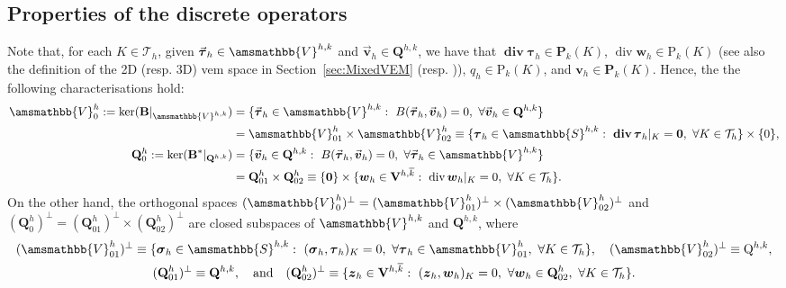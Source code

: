 \documentclass[fleqn,a4paper]{cas-sc}
\newcommand\qan{\quad\hbox{and}\quad}
\newcommand\cero{\boldsymbol{0}}
\newcommand\vdiv{\mathop{\mathrm{div}}\nolimits}
\newcommand\bdiv{\mathop{\mathbf{div}}\nolimits}
\newcommand{\bB}{\mathbf{B}}
\newcommand{\bbS}{\amsmathbb{S}}
\newcommand{\bv}{\boldsymbol{v}}
\newcommand{\bw}{\boldsymbol{w}}
\newcommand{\bz}{\boldsymbol{z}}
\newcommand{\0}{\boldsymbol{0}}
\newcommand\cT{\mathcal{T}}
\newcommand\bP{\mathbf{P}}
\newcommand\bQ{\mathbf{Q}}
\newcommand\bV{\mathbf{V}}
\newcommand\rP{\mathrm{P}}
\newcommand\rQ{\mathrm{Q}}
\newcommand\bbV{\amsmathbb{V}}
\newcommand\bsigma{\boldsymbol{\sigma}}
\newcommand\btau{\boldsymbol{\tau}}
\numberwithin{equation}{section}
\numberwithin{figure}{section}
\begin{document}
\subsection{Properties of the discrete operators}
Note that, for each $K\in \cT_h$, given $\vec{\btau}_h\in \bbV^{h,k}$ and $\vec{\bv}_h\in \bQ^{h,k}$, we have that $\bdiv\btau_h \in \bP_k(K)$, $\vdiv\bw_h \in \rP_{k}(K)$ (see also the definition of the 2D (resp. 3D) \gls{vem} space in Section~\ref{sec:MixedVEM} (resp. \cite[Theorem 8.2]{beirao16b})), $q_h\in \rP_{k}(K)$, and $\bv_h\in \bP_k(K)$. Hence, the the following characterisations hold:
    \begin{align*}
        \bbV_0^h := \mathrm{ker}(\bB |_{\bbV^{h,k}}) &= \{ \vec{\btau}_h \in \bbV^{h,k}: \ B(\vec{\btau}_h,\vec{\bv}_h) = 0 ,\ \forall \vec{\bv}_h\in \bQ^{h,k}\} \nonumber
        \\ &= \bbV_{01}^h \times \bbV_{02}^h \equiv \{ \btau_h \in \bbS^{h,k}: \ \bdiv\btau_h|_K = \cero, \ \forall K\in\cT_h\} \times \{0\}, %
        \\
        \bQ_0^h := \mathrm{ker}(\bB^*|_{\bQ^{h,k}}) &= \{ \vec{\bv}_h \in \bQ^{h,k}: \ B(\vec{\btau}_h,\vec{\bv}_h) = 0 ,\ \forall \vec{\btau}_h\in \bbV^{h,k}\}  \nonumber 
        \\ &= \bQ_{01}^h \times \bQ_{02}^h \equiv \{\cero\}\times \{ \bw_h \in \bV^{h,\overline{k}}: \ \vdiv\bw_h|_K = 0, \ \forall K\in\cT_h\}. %
    \end{align*}
On the other hand, the orthogonal spaces $(\bbV_0^h)^{\perp}= (\bbV_{01}^h)^{\perp} \times (\bbV_{02}^h)^{\perp}$ and $(\bQ_0^h)^{\perp}= (\bQ_{01}^h)^{\perp} \times (\bQ_{02}^h)^{\perp}$ are closed subspaces of $\bbV^{h,k}$ and $\bQ^{h,k}$, where 
    \begin{gather*}
        (\bbV_{01}^h)^{\perp}  \equiv \{ \bsigma_h \in \bbS^{h,k}:\ (\bsigma_h,\btau_h)_K =0 ,\ \forall \btau_h \in  \bbV_{01}^h,\ \forall K\in\cT_h\}, \quad (\bbV_{02}^h)^{\perp}\equiv \rQ^{h,k},\\
        (\bQ_{01}^h)^{\perp} \equiv \bQ^{h,k}, \qan (\bQ_{02}^h)^{\perp} \equiv \{ \bz_h \in \bV^{h,\overline{k}}:\ (\bz_h,\bw_h)_K =0, \ \forall \bw_h \in  \bQ_{02}^h, \ \forall K\in\cT_h\}.
    \end{gather*}
    
\end{document}
